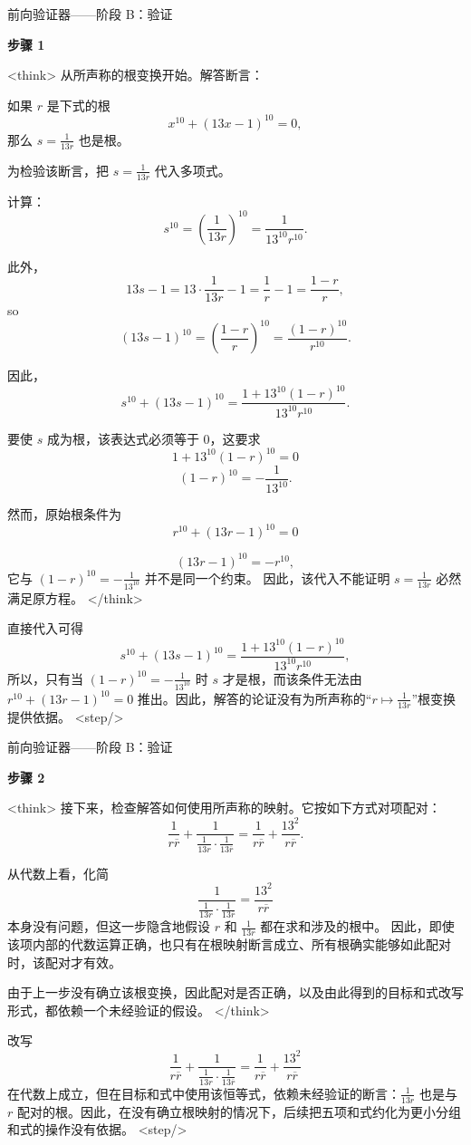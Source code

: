 \documentclass[11pt]{article}
\begin{document}
\begin{exbox}{前向验证器——阶段 B：验证}

\textbf{步骤 1}

<think>
从所声称的根变换开始。解答断言：

如果 \(r\) 是下式的根
\[
x^{10} + (13x - 1)^{10} = 0,
\]
那么 \(s = \frac{1}{13r}\) 也是根。

为检验该断言，把 \(s = \frac{1}{13r}\) 代入多项式。

计算：
\[
s^{10} = \left(\frac{1}{13r}\right)^{10} = \frac{1}{13^{10} r^{10}}.
\]

此外，
\[
13s - 1 = 13 \cdot \frac{1}{13r} - 1 = \frac{1}{r} - 1 = \frac{1-r}{r},
\]
so
\[
(13s - 1)^{10} = \left(\frac{1-r}{r}\right)^{10} = \frac{(1-r)^{10}}{r^{10}}.
\]

因此，
\[
s^{10} + (13s - 1)^{10}
= \frac{1 + 13^{10}(1-r)^{10}}{13^{10} r^{10}}.
\]

要使 \(s\) 成为根，该表达式必须等于 \(0\)，这要求
\[
1 + 13^{10}(1-r)^{10} = 0
\]
\[
(1-r)^{10} = -\frac{1}{13^{10}}.
\]

然而，原始根条件为
\[
r^{10} + (13r - 1)^{10} = 0
\]

\[
(13r - 1)^{10} = -r^{10},
\]
它与 \((1-r)^{10} = -\frac{1}{13^{10}}\) 并不是同一个约束。
因此，该代入不能证明 \(s=\frac{1}{13r}\) 必然满足原方程。
</think>

直接代入可得
\[
s^{10} + (13s - 1)^{10} = \frac{1 + 13^{10}(1-r)^{10}}{13^{10} r^{10}},
\]
所以，只有当 \((1-r)^{10} = -\frac{1}{13^{10}}\) 时 \(s\) 才是根，而该条件无法由
\(r^{10} + (13r - 1)^{10} = 0\) 推出。因此，解答的论证没有为所声称的“\(r \mapsto \frac{1}{13r}\)”根变换提供依据。
<step/>
\end{exbox}

\begin{exbox}{前向验证器——阶段 B：验证}

\textbf{步骤 2}

<think>
接下来，检查解答如何使用所声称的映射。它按如下方式对项配对：
\[
\frac{1}{r\overline{r}} + \frac{1}{\frac{1}{13r}\cdot\frac{1}{13\overline{r}}}
= \frac{1}{r\overline{r}} + \frac{13^{2}}{r\overline{r}}.
\]

从代数上看，化简
\[
\frac{1}{\frac{1}{13r}\cdot\frac{1}{13\overline{r}}} = \frac{13^2}{r\overline{r}}
\]
本身没有问题，但这一步隐含地假设 \(r\) 和 \(\frac{1}{13r}\) 都在求和涉及的根中。
因此，即使该项内部的代数运算正确，也只有在根映射断言成立、所有根确实能够如此配对时，该配对才有效。

由于上一步没有确立该根变换，因此配对是否正确，以及由此得到的目标和式改写形式，都依赖一个未经验证的假设。
</think>

改写
\[
\frac{1}{r\overline{r}} + \frac{1}{\frac{1}{13r}\cdot\frac{1}{13\overline{r}}}
= \frac{1}{r\overline{r}} + \frac{13^{2}}{r\overline{r}}
\]
在代数上成立，但在目标和式中使用该恒等式，依赖未经验证的断言：\(\frac{1}{13r}\) 也是与 \(r\) 配对的根。因此，在没有确立根映射的情况下，后续把五项和式约化为更小分组和式的操作没有依据。
<step/>

\end{exbox}
\end{document}
